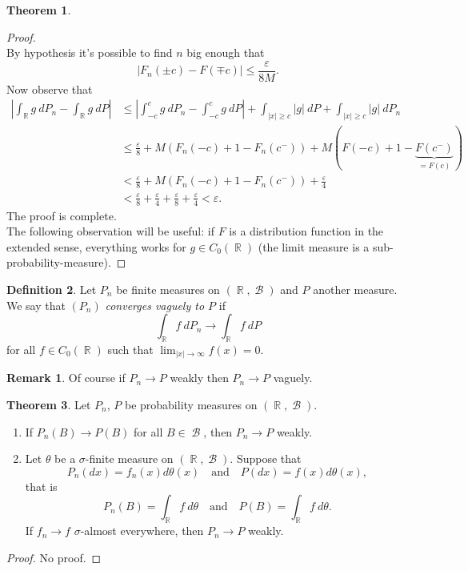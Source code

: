 \documentclass[12pt,a4paper]{report}
\theoremstyle{definition}
\newtheorem{theorem}{Theorem}[chapter] %
\newtheorem{definition}[theorem]{Definition}
\newtheorem*{remark}{Remark}
\theoremstyle{num.custom-title}
\DeclareMathOperator{\B}{\mathcal{B}}
\DeclareMathOperator{\R}{\mathbb{R}}
\renewcommand{\epsilon}{\varepsilon}
\renewcommand{\1}{\mathbbm{1}}
\begin{document}
\begin{theorem}
\begin{proof}
\[\]
By hypothesis it's possible to find $n$ big enough that
\[
|F_n(\pm c) - F(\mp c)| \leq \frac{\epsilon}{8M}.
\]
Now observe that
\begin{align*}
\left| \int_{\R} g \ dP_n - \int_{\R} g \ dP \right|
&\leq \left| \int_{-c}^c g \ dP_n - \int_{-c}^c g \ dP \right| + \int_{|x| \geq c} |g| \ dP + \int_{|x| \geq c} |g| \ dP_n \\
&\leq \frac{\epsilon}{8} + M(F_n(-c)+1-F_n(c^-)) + M(F(-c)+1-\underbrace{F(c^-)}_{=F(c)}) \\
&< \frac{\epsilon}{8} + M(F_n(-c) + 1 - F_n(c^-)) + \frac{\epsilon}{4} \\
&< \frac{\epsilon}{8} + \frac{\epsilon}{4} + \frac{\epsilon}{8} + \frac{\epsilon}{4} < \epsilon.
\end{align*}
The proof is complete.\\
The following observation will be useful: if $F$ is a distribution function in the extended sense, everything works for $g \in C_0(\R)$ (the limit measure is a sub-probability-measure).
\end{proof}
\end{theorem}

\begin{definition}
Let $P_n$ be finite measures on $(\R,\B)$ and $P$ another measure. We say that $(P_n)$ \emph{converges vaguely to $P$} if 
\[
\int_{\R} f \ dP_n \to \int_{\R} f \ dP
\]
for all $f \in C_0(\R)$ such that $\lim_{|x| \to \infty} f(x) = 0$.
\end{definition}

\begin{remark}
Of course if $P_n \to P$ weakly then $P_n \to P$ vaguely.
\end{remark}

\begin{theorem}
Let $P_n$, $P$ be probability measures on $(\R,\B)$.
\begin{enumerate}
\item If $P_n(B) \to P(B)$ for all $B \in \B$, then $P_n \to P$ weakly.
\item Let $\theta$ be a $\sigma$-finite measure on $(\R,\B)$. Suppose that
\[
P_n(dx) = f_n(x) d\theta(x) \quad \text{and} \quad P(dx) = f(x) d\theta(x),
\]
that is
\[
P_n(B) = \int_{\R} f \ d\theta \quad \text{and} \quad P(B) = \int_{\R} f \ d\theta.
\]
If $f_n \to f$ $\sigma$-almost everywhere, then $P_n \to P$ weakly.
\end{enumerate}
\begin{proof}
No proof.
\end{proof}
\end{theorem}
\end{document}
